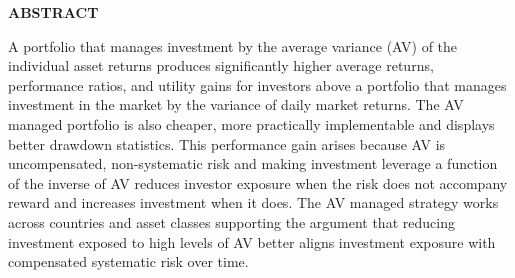 \centerline{\bf ABSTRACT}

\begin{doublespace}  %
%
%
%
%
%
%
%
%
  
\noindent A portfolio that manages investment by the average variance (AV) of the individual asset returns produces significantly higher average returns, performance ratios, and utility gains for investors above a portfolio that manages investment in the market by the variance of daily market returns. The AV managed portfolio is also cheaper, more practically implementable and displays better drawdown statistics. This performance gain arises because AV is uncompensated, non-systematic risk and making investment leverage a function of the inverse of AV reduces investor exposure when the risk does not accompany reward and increases investment when it does. The AV managed strategy works across countries and asset classes supporting the argument that reducing investment exposed to high levels of AV better aligns investment exposure with compensated systematic risk over time.
\end{doublespace}
